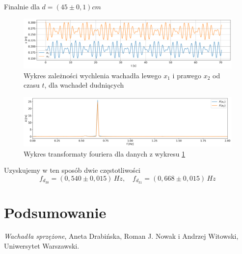 \documentclass[12pt]{article}
\begin{document}
Finalnie dla \(d = (45 \pm 0{,}1) cm\)
\begin{figure}[H]
    \centering
    \includegraphics[width=\linewidth]{beats_3}
    \caption{Wykres zależności wychlenia wachadła lewego \(x_1\) i prawego \(x_2\) od czasu \(t\), dla wachadeł dudniących}
    \label{fig:beats_2}
\end{figure}
\begin{figure}[H]
    \centering
    \includegraphics[width=\linewidth]{counterphase_3_fft}
    \caption{Wykres transformaty fouriera dla danych z wykresu \ref{fig:beats_2}}
    \label{fig:coutner_phase_2_fft}
\end{figure}
Uzyskujemy w ten sposób dwie częstotliwości
\[
    f_{d_30} = (0{,}540 \pm 0{,}015) \, Hz ,\quad f_{d_31} = (0{,}668 \pm 0{,}015) \, Hz
\]
\section{Podsumowanie}



\newpage

\begin{thebibliography}{2}

\emph{Wachadła sprzężone}, Aneta Drabińska, Roman J. Nowak i Andrzej Witowski, Uniwersytet Warszawski.

\end{thebibliography}
\end{document}
